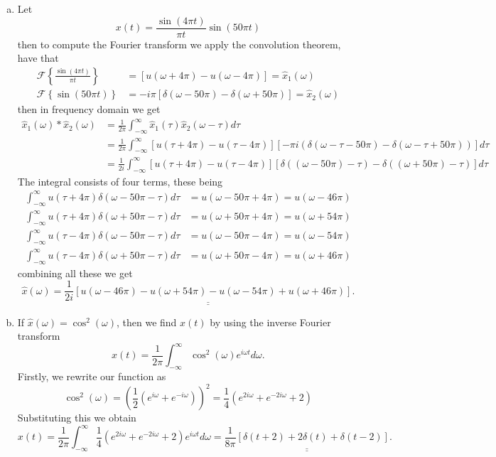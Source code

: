 \begin{enumerate}
\begin{enumerate}[a)]
\item Let
$$x(t)=\frac{\sin(4\pi t)}{\pi t}\sin(50\pi t)$$
then to compute the Fourier transform we apply the convolution theorem, have that
\begin{align*}
    \mathcal{F}\left\{\frac{\sin(4\pi t)}{\pi t}\right\}&=[u(\omega+4\pi)-u(\omega-4\pi)]=\hat{x}_{1}(\omega) \\
    \mathcal{F}\left\{\sin(50\pi t)\right\}&=-i\pi[\delta(\omega-50\pi)-\delta(\omega+50\pi)]=\hat{x}_{2}(\omega)
\end{align*}
then in frequency domain we get
\begin{align*}
\hat{x}_{1}(\omega)*\hat{x}_{2}(\omega)&=\frac{1}{2\pi}\int_{-\infty}^{\infty}\hat{x}_{1}(\tau)\hat{x}_{2}(\omega-\tau)d\tau \\
&=\frac{1}{2\pi}\int_{-\infty}^{\infty}[u(\tau+4\pi)-u(\tau-4\pi)][-\pi i(\delta(\omega-\tau-50\pi)-\delta(\omega-\tau+50\pi))]d\tau \\
&=\frac{1}{2i}\int_{-\infty}^{\infty}[u(\tau+4\pi)-u(\tau-4\pi)][\delta((\omega-50\pi)-\tau)-\delta((\omega+50\pi)-\tau)]d\tau
\end{align*}
The integral consists of four terms, these being
\begin{align*}
    \int_{-\infty}^{\infty}u(\tau+4\pi)\delta(\omega-50\pi-\tau)d\tau&=u(\omega-50\pi+4\pi)=u(\omega-46\pi) \\
    \int_{-\infty}^{\infty}u(\tau+4\pi)\delta(\omega+50\pi-\tau)d\tau&=u(\omega+50\pi+4\pi)=u(\omega+54\pi) \\
    \int_{-\infty}^{\infty}u(\tau-4\pi)\delta(\omega-50\pi-\tau)d\tau&=u(\omega-50\pi-4\pi)=u(\omega-54\pi) \\
    \int_{-\infty}^{\infty}u(\tau-4\pi)\delta(\omega+50\pi-\tau)d\tau&=u(\omega+50\pi-4\pi)=u(\omega+46\pi)
\end{align*}
combining all these we get
$$\hat{x}(\omega)=\underline{\underline{\frac{1}{2i}[u(\omega-46\pi)-u(\omega+54\pi)-u(\omega-54\pi)+u(\omega+46\pi)]}}.$$

\item If $\hat{x}(\omega)=\cos^{2}(\omega)$, then we find $x(t)$ by using the inverse Fourier transform
$$x(t)=\frac{1}{2\pi}\int_{-\infty}^{\infty}\cos^{2}(\omega)e^{i\omega t}d\omega.$$
Firstly, we rewrite our function as
$$\cos^{2}(\omega)=\left(\frac{1}{2}\left(e^{i\omega}+e^{-i\omega}\right)\right)^{2}=\frac{1}{4}\left(e^{2i\omega }+e^{-2i\omega}+2\right)$$
Substituting this we obtain
$$x(t)=\frac{1}{2\pi}\int_{-\infty}^{\infty}\frac{1}{4}\left(e^{2i\omega }+e^{-2i\omega}+2\right)e^{i\omega t}d\omega=\underline{\underline{\frac{1}{8\pi}[\delta(t+2)+2\delta(t)+\delta(t-2)]}}.$$
\end{enumerate}


\end{enumerate}
